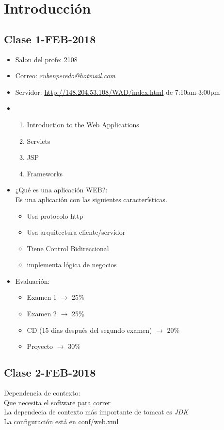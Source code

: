 \documentclass{article}
\begin{document}
\maketitle
\tableofcontents
\newpage
\section{Introducción}
\subsection{Clase 1-FEB-2018}
\begin{itemize}
	\item Salon del profe: 2108
	\item Correo: \textit{rubenperedo@hotmail.com}
	\item Servidor: \url{http://148.204.53.108/WAD/index.html} de 7:10am-3:00pm
	\item \begin{enumerate}
		\item Introduction to the Web Applications
		\item Servlets
		\item JSP
		\item Frameworks
	\end{enumerate}
	\item ¿Qué es una aplicación WEB?:\\
	Es una aplicación con las siguientes características.
	\begin{itemize}
		\item Usa protocolo http
		\item Usa arquitectura cliente/servidor
		\item Tiene Control Bidireccional
		\item implementa lógica de negocios
	\end{itemize}
	\item Evaluación:
	\begin{itemize}
		\item Examen 1 $\rightarrow$ 25\%
		\item Examen 2 $\rightarrow$ 25\%
		\item CD (15 dìas después del segundo examen) $\rightarrow$ 20\%
		\item Proyecto $\rightarrow$ 30\%
	\end{itemize}
\end{itemize}
\subsection{Clase 2-FEB-2018}
Dependencia de contexto:\\
Que necesita el software para correr\\
La dependecia de contexto más importante de tomcat es \textit{JDK}\\
La configuración está en conf/web.xml
\end{document}
